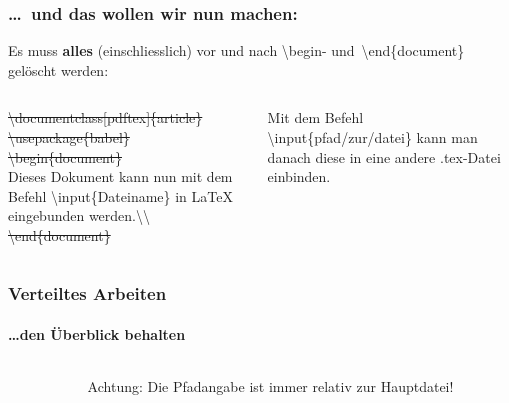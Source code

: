 
\begin{frame}
\frametitle{\ldots ~und das wollen wir nun machen:}
Es muss \textbf{alles} (einschliesslich) vor und nach \color{unibablueI}\textbackslash begin\color{black}- 
und\color{unibablueI}~\textbackslash end\color{black}\{document\} gel\"oscht werden:\\[5mm]
\begin{columns}
\begin{column}{.47\textwidth}
\sout{\color{nounibaredI}\color{nounibaredI}\textbackslash documentclass\color{black}\color{nounibagreenI}[pdftex]\color{black}\{article\} \\
\color{nounibaredI}\textbackslash usepackage\color{black}\{babel\}\\
\color{nounibaredI}\color{unibablueI}\textbackslash\color{unibablueI}begin\color{black}\color{black}\{document\} }\\
Dieses Dokument kann nun mit dem Befehl \color{nounibaredI}\color{nounibaredI}\textbackslash input\color{nounibaredI}\color{black}\{Dateiname\} in LaTeX eingebunden werden.\color{nounibaredI}\color{nounibaredI}\textbackslash \color{nounibaredI}\textbackslash \color{black}  \\
\sout{\color{nounibaredI}\color{unibablueI}\textbackslash\color{unibablueI}end\color{black}\color{black}\{document\} }
\end{column}
\begin{column}{.47\textwidth}
Mit dem Befehl \color{nounibaredI}\textbackslash input\color{black}\{pfad/zur/datei\} kann man danach
 diese in eine andere {\ttfamily .tex}-Datei einbinden.

\end{column}
\end{columns}
\end{frame}


\begin{frame}
\frametitle{Verteiltes Arbeiten}
\framesubtitle{\ldots den \"Uberblick behalten}
\begin{columns}{2}
\begin{column}{.6\textwidth}
\end{column}
\begin{column}{.3\textwidth}
\begin{alertblock}{Achtung:}
Die Pfadangabe ist immer relativ zur Hauptdatei!
\end{alertblock}
\end{column}
\end{columns}

\end{frame}



